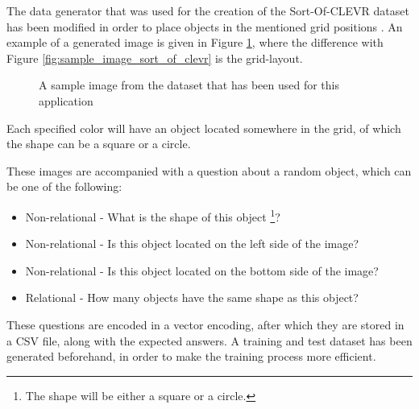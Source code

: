 \documentclass[english]{sobraep}
\begin{document}
The data generator that was used for the creation of the Sort-Of-CLEVR dataset has been modified in order to place objects in the mentioned grid positions \cite{sort_of_clevr_dataset}. An example of a generated image is given in Figure \ref{fig:sample_image_own_dataset}, where the difference with Figure \ref{fig:sample_image_sort_of_clevr} is the grid-layout.

\begin{figure}[htp]
    \begin{center}
    \captionsetup{justification=centering}
    \caption{A sample image from the dataset that has been used for this application}
    \label{fig:sample_image_own_dataset}
    \end{center}
\end{figure}

Each specified color will have an object located somewhere in the grid, of which the shape can be a square or a circle.

These images are accompanied with a question about a random object, which can be one of the following:
\begin{itemize}
    \item Non-relational - What is the shape of this object \footnote{The shape will be either a square or a circle.}?
    \item Non-relational - Is this object located on the left side of the image?
    \item Non-relational - Is this object located on the bottom side of the image?
    \item Relational - How many objects have the same shape as this object?
\end{itemize}

These questions are encoded in a vector encoding, after which they are stored in a CSV file, along with the expected answers. A training and test dataset has been generated beforehand, in order to make the training process more efficient. 
\end{document}
